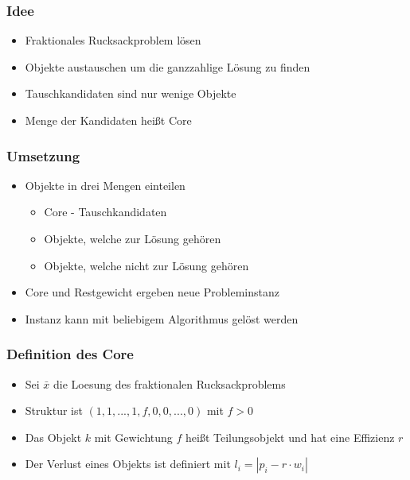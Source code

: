 \documentclass{presentation}
\begin{document}
\begin{frame}
\end{frame}



\begin{frame}
    \frametitle{Idee}
    \begin{itemize}
        \item Fraktionales Rucksackproblem lösen
        \item Objekte austauschen um die ganzzahlige Lösung zu finden
        \item Tauschkandidaten sind nur wenige Objekte
        \item Menge der Kandidaten heißt Core
    \end{itemize}
\end{frame}



\begin{frame}
    \frametitle{Umsetzung}
    \begin{itemize}
        \item Objekte in drei Mengen einteilen
        \begin{itemize}
            \item Core - Tauschkandidaten
            \item Objekte, welche zur Lösung gehören
            \item Objekte, welche nicht zur Lösung gehören
        \end{itemize}
        \pause

        \item Core und Restgewicht ergeben neue Probleminstanz %
        \item Instanz kann mit beliebigem Algorithmus gelöst werden
    \end{itemize}
\end{frame}

\begin{frame}
    \frametitle{Definition des Core}
    
    \begin{itemize}
        \item Sei $\bar{x}$ die Loesung des fraktionalen Rucksackproblems
        \pause
        
        \item Struktur ist $(1, 1, ..., 1, f, 0, 0, ..., 0)$ mit $f > 0$
        \pause
        
        \item Das Objekt $k$ mit Gewichtung $f$ heißt Teilungsobjekt und hat eine Effizienz $r$
        \pause
        
        \item Der Verlust eines Objekts ist definiert mit $l_i = |p_i - r \cdot w_i|$
    \end{itemize}
\end{frame}
\end{document}
